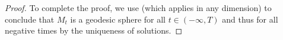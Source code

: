 \documentclass{amsart}
\begin{document}
\begin{proof}
To complete the proof, we use \cite[Proposition 5.3]{bryanlouie} (which applies in any dimension) to conclude that \(M_t\) is a geodesic sphere for all \(t \in (-\infty, T)\) and thus for all negative times by the uniqueness of solutions.
\end{proof}




\end{document}
